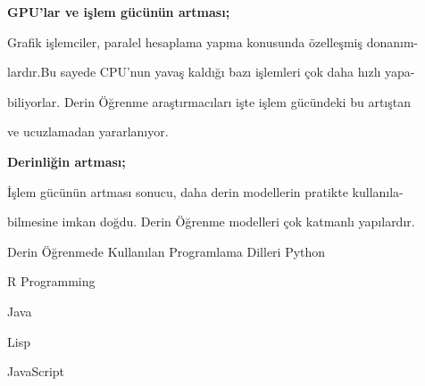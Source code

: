 \documentclass{beamer}                                                                                          %
\begin{document}
	\begin{frame}
        \justifying
        \color{myred1}\textbf{GPU'lar ve işlem gücünün artması;}\color{black}\par \vspace{2} \hspace{10}Grafik işlemciler, paralel hesaplama yapma konusunda özelleşmiş donanım-\par \vspace{2} \hspace{10}lardır.Bu sayede CPU’nun yavaş kaldığı bazı işlemleri çok daha hızlı yapa-\par \vspace{2} \hspace{10}biliyorlar. Derin Öğrenme araştırmacıları işte işlem gücündeki bu artıştan \par \vspace{2} \hspace{10}ve ucuzlamadan yararlanıyor.\par \vspace{25}
        \color{myred1}\textbf{Derinliğin artması;}\color{black} \par \vspace{2} \hspace{10}İşlem gücünün artması sonucu, daha derin modellerin pratikte kullanıla-\par \vspace{2} \hspace{10}bilmesine imkan doğdu. Derin Öğrenme modelleri çok katmanlı yapılardır.
    \end{frame}
    
   
    \begin{frame}{Derin Öğrenmede Kullanılan Programlama Dilleri}
        \color{myred1} \color{black}Python \par \vspace{15}
        \color{myred1} \color{black}R Programming \par \vspace{15}
        \color{myred1} \color{black}Java \par \vspace{15}
        \color{myred1} \color{black}Lisp \par \vspace{15}
        \color{myred1} \color{black}JavaScript
    \end{frame}
    
\end{document}
